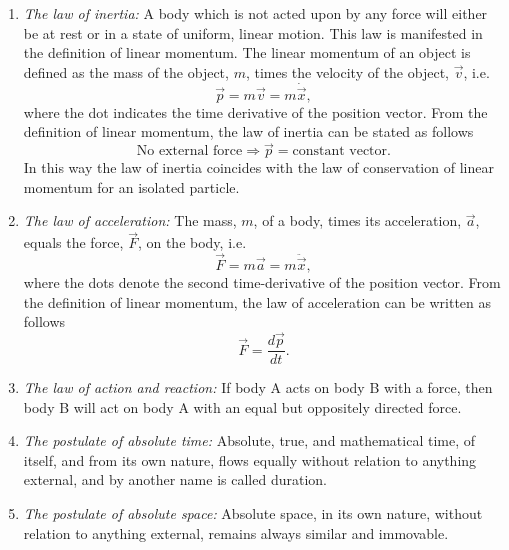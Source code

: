\begin{enumerate}
	\item \emph{The law of inertia:} A body which is not acted upon by any force will either be at rest or in a state of uniform,  linear motion. This law is manifested in the definition of linear momentum. The linear momentum of an object is defined as the mass of the object, $m$, times the velocity of the object, $\vec{v}$, i.e.
	\begin{equation}
		\vec{p}=m\vec{v}=m\dot{\vec{x}},
	\end{equation} 
	where the dot indicates the time derivative of the position vector. From the definition of linear momentum, the law of inertia can be stated as follows
	\begin{equation}
		\text{No external force} \Rightarrow \vec{p}= \text{constant vector}.
	\end{equation} 
	In this way the law of inertia coincides with the law of conservation of linear momentum for an isolated particle. 
	
	\item \emph{The law of acceleration:} The mass, $m$, of a body, times its acceleration, $\vec{a}$, equals the force, $\vec{F}$, on the body, i.e. 
	\begin{equation}
		\vec{F}=m\vec{a}=m\ddot{\vec{x}},
	\end{equation} 
	where the dots denote the second time-derivative of the position vector. From the definition of linear momentum, the law of acceleration can be written as follows
	\begin{equation}
		\vec{F}=\frac{d\vec{p}}{dt}.
	\end{equation} 
	
	\item \emph{The law of action and reaction:} If body A acts on body B with a force, then body B will act on body A with an equal but oppositely directed force.
	
	\item \emph{The postulate of absolute time:} Absolute, true, and mathematical time, of itself, and from its own nature, flows equally without relation to anything external, and by another name is called duration.
	
	\item \emph{The postulate of absolute space:} Absolute space, in its own nature, without relation to anything external, remains always similar and immovable.
\end{enumerate} 
